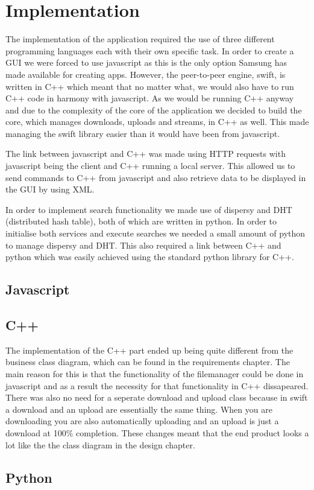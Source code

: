 \chapter{Implementation}

The implementation of the application required the use of three different programming languages each with their own specific task. In order to create a GUI we were forced to use javascript as this is the only option Samsung has made available for creating apps. However, the peer-to-peer engine, swift, is written in C++ which meant that no matter what, we would also have to run C++ code in harmony with javascript. As we would be running C++ anyway and due to the complexity of the core of the application we decided to build the core, which manages downloads, uploads and streams, in C++ as well. This made managing the swift library easier than it would have been from javascript.

The link between javascript and C++ was made using HTTP requests with javascript being the client  and C++ running a local server. This allowed us to send commands to C++ from javascript and also retrieve data to be displayed in the GUI by using XML.

In order to implement search functionality we made use of dispersy and DHT (distributed hash table), both of which are written in python. In order to initialise both services and execute searches we needed a small amount of python to manage dispersy and DHT. This also required a link between C++ and python which was easily achieved using the standard python library for C++.

\section{Javascript}

\section{C++}

The implementation of the C++ part ended up being quite different from the business class diagram, which can be found in the requirements chapter. The main reason for this is that the functionality of the filemanager could be done in javascript and as a result the necessity for that functionality in C++ dissapeared. There was also no need for a seperate download and upload class because in swift a download and an upload are essentially the same thing. When you are downloading you are also automatically uploading and an upload is just a download at 100\% completion. These changes meant that the end product looks a lot like the the class diagram in the design chapter.

\section{Python}

